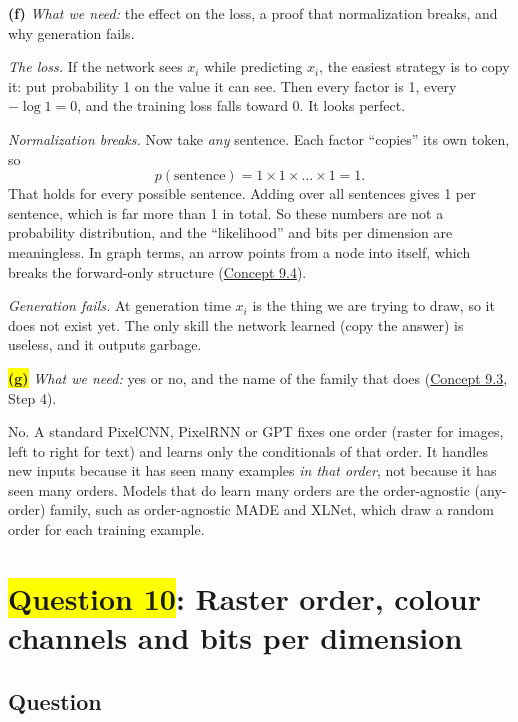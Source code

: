 \documentclass[12pt,a4paper]{article}
\begin{document}
\textbf{(f)} \emph{What we need:} the effect on the loss, a proof that normalization breaks, and why generation fails.

\emph{The loss.} If the network sees $x_i$ while predicting $x_i$, the easiest strategy is to copy it: put probability 1 on the value it can see. Then every factor is 1, every $-\log1=0$, and the training loss falls toward 0. It looks perfect.

\emph{Normalization breaks.} Now take \emph{any} sentence. Each factor ``copies'' its own token, so
\[
p(\text{sentence})=1\times1\times\dots\times1=1 .
\]
That holds for every possible sentence. Adding over all sentences gives 1 per sentence, which is far more than 1 in total. So these numbers are not a probability distribution, and the ``likelihood'' and bits per dimension are meaningless. In graph terms, an arrow points from a node into itself, which breaks the forward-only structure (\hyperref[c9-4]{Concept 9.4}).

\emph{Generation fails.} At generation time $x_i$ is the thing we are trying to draw, so it does not exist yet. The only skill the network learned (copy the answer) is useless, and it outputs garbage.

\colorbox{yellow}{\textbf{(g)}} \emph{What we need:} yes or no, and the name of the family that does (\hyperref[c9-3]{Concept 9.3}, Step 4).

No. A standard PixelCNN, PixelRNN or GPT fixes one order (raster for images, left to right for text) and learns only the conditionals of that order. It handles new inputs because it has seen many examples \emph{in that order}, not because it has seen many orders. Models that do learn many orders are the order-agnostic (any-order) family, such as order-agnostic MADE and XLNet, which draw a random order for each training example.
\newpage
\section{\texorpdfstring{\colorbox{yellow}{Question 10}}{Question 10}: Raster order, colour channels and bits per dimension}

\subsection{Question}
\end{document}
